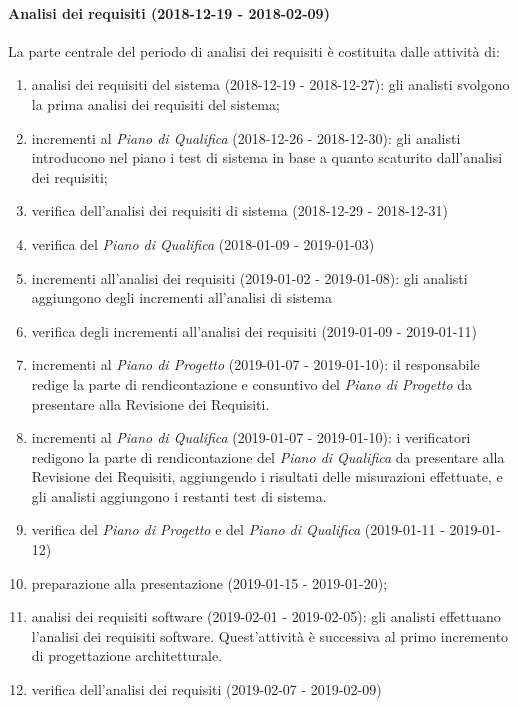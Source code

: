 		\paragraph{Analisi dei requisiti (2018-12-19 - 2018-02-09)\\} La parte centrale del periodo di analisi dei requisiti è costituita dalle attività di:
			\begin{enumerate}[label = 2.2.\arabic*)]
				\item analisi dei requisiti del sistema (2018-12-19 - 2018-12-27): gli analisti svolgono la prima analisi dei requisiti del sistema;
				\item incrementi al \textit{Piano di Qualifica} (2018-12-26 - 2018-12-30): gli analisti introducono nel piano i test di sistema in base a quanto scaturito dall'analisi dei requisiti;
				\item verifica dell'analisi dei requisiti di sistema (2018-12-29 - 2018-12-31)
				\item verifica del \textit{Piano di Qualifica} (2018-01-09 - 2019-01-03)
				\item incrementi all'analisi dei requisiti (2019-01-02 - 2019-01-08): gli analisti aggiungono degli incrementi all'analisi di sistema
				\item verifica degli incrementi all'analisi dei requisiti (2019-01-09 - 2019-01-11)
				\item incrementi al \textit{Piano di Progetto} (2019-01-07 - 2019-01-10): il responsabile redige la parte di rendicontazione e consuntivo del \textit{Piano di Progetto} da presentare alla Revisione dei Requisiti.
				\item incrementi al \textit{Piano di Qualifica} (2019-01-07 - 2019-01-10): i verificatori redigono la parte di rendicontazione del \textit{Piano di Qualifica} da presentare alla Revisione dei Requisiti, aggiungendo i risultati delle misurazioni effettuate, e gli analisti aggiungono i restanti test di sistema.
				\item verifica del \textit{Piano di Progetto} e del \textit{Piano di Qualifica} (2019-01-11 - 2019-01-12)
				\item preparazione alla presentazione (2019-01-15 - 2019-01-20);
				\item analisi dei requisiti software (2019-02-01 - 2019-02-05): gli analisti effettuano l'analisi dei requisiti software. Quest'attività è successiva al primo incremento di progettazione architetturale.
				\item verifica dell'analisi dei requisiti (2019-02-07 - 2019-02-09)				
			\end{enumerate}
